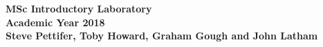 
\begin{center}
\bfseries\Large MSc Introductory Laboratory\\[2ex]
\large Academic Year 2018\\[2ex]
\normalsize Steve Pettifer, Toby Howard, Graham Gough and John Latham
\end{center}






